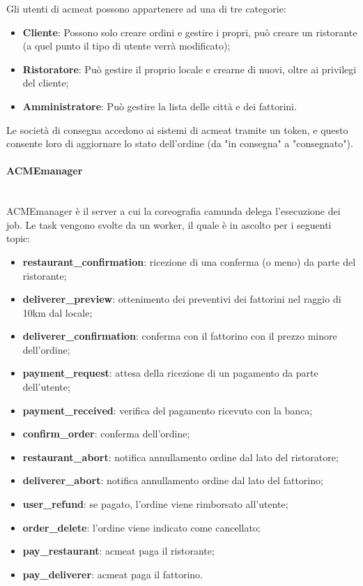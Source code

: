 \documentclass[11pt]{article} %
\begin{document}
Gli utenti di acmeat possono appartenere ad una di tre categorie:
\begin{itemize}
\item \textbf{Cliente}: Possono solo creare ordini e gestire i propri, può creare un ristorante (a quel punto il tipo di utente verrà modificato);
\item \textbf{Ristoratore}: Può gestire il proprio locale e crearne di nuovi, oltre ai privilegi del cliente;
\item \textbf{Amministratore}: Può gestire la lista delle città e dei fattorini.
\end{itemize}
Le società di consegna accedono ai sistemi di acmeat tramite un token, e questo consente loro di aggiornare lo stato dell'ordine (da "in consegna" a "consegnato").

\paragraph{ACMEmanager}\mbox{}\\
ACMEmanager è il server a cui la coreografia camunda delega l'esecuzione dei job. Le task vengono svolte da un worker, il quale è in ascolto per i seguenti topic:
\begin{itemize}
\item \textbf{restaurant\_confirmation}: ricezione di una conferma (o meno) da parte del ristorante;
\item \textbf{deliverer\_preview}: ottenimento dei preventivi dei fattorini nel raggio di 10km dal locale;
\item \textbf{deliverer\_confirmation}: conferma con il fattorino con il prezzo minore dell'ordine;
\item \textbf{payment\_request}: attesa della ricezione di un pagamento da parte dell'utente;
\item \textbf{payment\_received}: verifica del pagamento ricevuto con la banca;
\item \textbf{confirm\_order}: conferma dell'ordine;
\item \textbf{restaurant\_abort}: notifica annullamento ordine dal lato del ristoratore;
\item \textbf{deliverer\_abort}: notifica annullamento ordine dal lato del fattorino;
\item \textbf{user\_refund}: se pagato, l'ordine viene rimborsato all'utente;
\item \textbf{order\_delete}: l'ordine viene indicato come cancellato;
\item \textbf{pay\_restaurant}: acmeat paga il ristorante;
\item \textbf{pay\_deliverer}: acmeat paga il fattorino.
\end{itemize}
\end{document}
